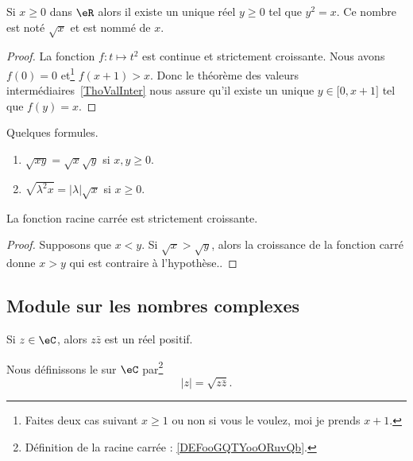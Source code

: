 \begin{corollaryDef}     \label{DEFooGQTYooORuvQb}
	Si \( x\geq 0\) dans \( \eR\) alors il existe un unique réel \( y\geq 0\) tel que \( y^2=x\). Ce nombre est noté \( \sqrt{x}\) et est nommé  de \( x\).
\end{corollaryDef}

\begin{proof}
	La fonction \( f\colon t\mapsto t^2\) est continue et strictement croissante. Nous avons \( f(0)=0\) et\footnote{Faites deux cas suivant \( x\geq 1\) ou non si vous le voulez, moi je prends \( x+1\).} \( f(x+1)>x\). Donc le théorème des valeurs intermédiaires~\ref{ThoValInter} nous assure qu'il existe un unique \( y\in\mathopen[ 0 , x+1 \mathclose]\) tel que \( f(y)=x\).
\end{proof}

\begin{lemma}       \label{LEMooWSVNooKsymDy}
    Quelques formules.
    \begin{enumerate}
        \item
        $\sqrt{ xy }=\sqrt{ x }\sqrt{ y }$ si \( x,y\geq 0\).
    \item       \label{ITEMooEPHBooCEeJOD}
        \( \sqrt{ \lambda^2 x }=| \lambda |\sqrt{ x }\) si \( x\geq 0\).
    \end{enumerate}
\end{lemma}

\begin{lemma}       \label{LEMooSBOAooOOIotR}
	La fonction racine carrée est strictement croissante.
\end{lemma}

\begin{proof}
	Supposons que \( x<y\). Si \( \sqrt{ x }>\sqrt{ y }\), alors la croissance de la fonction carré donne \( x>y\) qui est contraire à l'hypothèse..
\end{proof}

\subsection{Module sur les nombres complexes}

\begin{lemmaDef}        \label{LEMooVHDAooJyoakR}
	Si \( z\in \eC\), alors \( z\bar z\) est un réel positif.

	Nous définissons le  sur \( \eC\) par\footnote{Définition de la racine carrée : \ref{DEFooGQTYooORuvQb}.}
	\begin{equation}
		| z |=\sqrt{ z\bar z }.
	\end{equation}
\end{lemmaDef}

